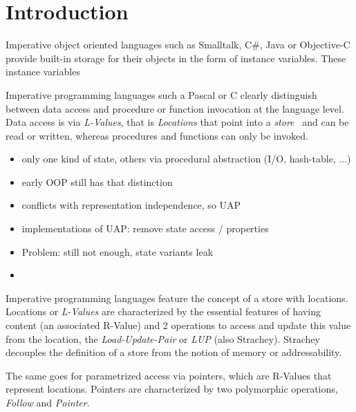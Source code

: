\documentclass[preprint]{sigplanconf}
\begin{document}



\section{Introduction}

Imperative object oriented languages such as Smalltalk, C\#, Java or Objective-C provide
built-in storage for their objects in the form of instance variables.  These instance
variables 

Imperative programming languages such a Pascal or C clearly distinguish between
data access and procedure or function invocation at the language level.  Data 
access is via \emph{L-Values}, that is \emph{Locations} that point into a \emph{store}~\cite{StracheyFund}
and can be read or written, whereas procedures and functions can only be invoked.

\begin{itemize}
\item only one kind of state, others via procedural abstraction (I/O, hash-table, ...)
\item early OOP still has that distinction
\item conflicts with representation independence, so UAP
\item implementations of UAP:  remove state access / properties
\item Problem:  still not enough, state variants leak
\item 
\end{itemize}


Imperative programming languages feature the concept of a store with locations.
Locations or \emph{L-Values} are characterized by the essential features of having content 
(an associated R-Value) and 2 operations to access and update this value from the location,
the \emph{Load-Update-Pair} or \emph{LUP} (also Strachey).  Strachey decouples the definition of a store
from the notion of memory or addressability. 

The same goes for parametrized access via pointers, which are 
R-Values that represent locations.  Pointers are characterized by two polymorphic 
operations, \emph{Follow} and \emph{Pointer}.  
\end{document}
